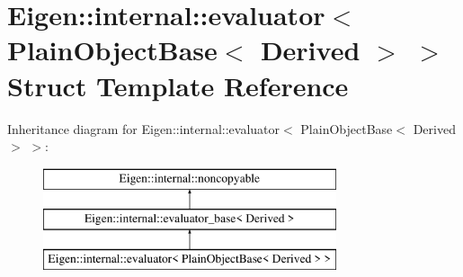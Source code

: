 \hypertarget{struct_eigen_1_1internal_1_1evaluator_3_01_plain_object_base_3_01_derived_01_4_01_4}{}\section{Eigen\+::internal\+::evaluator$<$ Plain\+Object\+Base$<$ Derived $>$ $>$ Struct Template Reference}
\label{struct_eigen_1_1internal_1_1evaluator_3_01_plain_object_base_3_01_derived_01_4_01_4}
Inheritance diagram for Eigen\+::internal\+::evaluator$<$ Plain\+Object\+Base$<$ Derived $>$ $>$\+:\begin{figure}[H]
\begin{center}
\leavevmode
\includegraphics[height=3.000000cm]{struct_eigen_1_1internal_1_1evaluator_3_01_plain_object_base_3_01_derived_01_4_01_4}
\end{center}
\end{figure}
